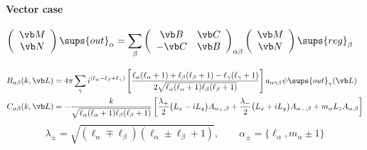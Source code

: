 \documentclass[letterpaper]{article}
\begin{document}

\paragraph{Vector case}

\begin{align*}
 \left(\begin{array}{c}
   \vb M \\ \vb N
 \end{array}\right)\sups{out}_\alpha
&= 
 \sum_{\beta}
 \left(\begin{array}{cc}
   \vb B & \vb C \\ 
  -\vb C & \vb B
 \end{array}\right)_{\alpha\beta} 
 \left(\begin{array}{c}
   \vb M \\ \vb N 
 \end{array}\right)\sups{reg}_\beta
\end{align*}

\begin{align*}
 B_{\alpha\beta}(k, \vb L)
&=4\pi 
  \sum_\gamma i^{(\ell_\alpha - \ell_\beta + \ell_\gamma)}
  \left[\frac{\ell_\alpha(\ell_\alpha + 1) + \ell_\beta(\ell_\beta + 1) 
               -\ell_\gamma(\ell_\gamma+ 1)
             }
             {2\sqrt{\ell_\alpha(\ell_\alpha+1)\ell_\beta (\ell_\beta+1)}}
  \right]
  a_{\alpha\gamma\beta} 
  \psi\sups{out}_\gamma(\vb L)
\\
 C_{\alpha\beta}(k, \vb L)
&=-\frac{k}{\sqrt{\ell_\alpha(\ell_\alpha+1)\ell_\beta(\ell_\beta+1)}}
   \left[ \frac{\lambda_+}{2}\big(L_x - iL_y\big)A_{\alpha_+, \beta} 
         +\frac{\lambda_-}{2}\big(L_x + iL_y\big)A_{\alpha_-, \beta} 
         +           m_\alpha L_z A_{\alpha, \beta} 
   \right]
\end{align*}
$$ \lambda_\pm = \sqrt{ (\ell_\alpha \mp \ell_\beta)
                        (\ell_\alpha \pm \ell_\beta+1)
                      },
   \qquad
   \alpha_\pm = \{\ell_\alpha, m_\alpha \pm 1\}
$$

\newpage
\end{document}
